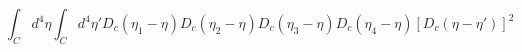 \begin{equation}
\int_Cd^4\eta \int_Cd^4\eta' 
D_c(\eta_1 - \eta)D_c(\eta_2 - \eta)D_c(\eta_3 - \eta)D_c(\eta_4 - \eta)
[D_c(\eta - \eta')]^2
\end{equation}

